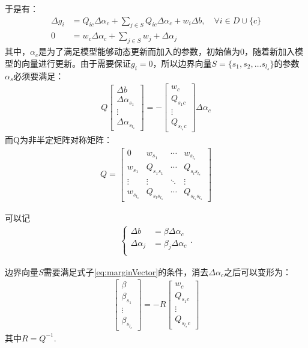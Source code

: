 \documentclass[UTF8]{csoarticle}
\begin{document}
于是有：
\begin{align}\label{eq:deltag}
\Delta g_i &= Q_{ic}\Delta\alpha_c+\sum_{j\in S}{Q_{ic}\Delta\alpha_c}+ w_i\Delta b, \quad \forall i \in D \cup\{c\}\\
0&=w_c\Delta\alpha_c+\sum_{j \in S}w_j +\Delta\alpha_j
\end{align}
其中，$\alpha_c$是为了满足模型能够动态更新而加入的参数，初始值为0，随着新加入模型的向量进行更新。由于需要保证$g_i=0$，所以边界向量$S=\{s_1,s_2,…s_{l_s}\}$的参数$\alpha_s$必须要满足：
\begin{align}\label{eq:marginVector}
Q\begin{bmatrix}\Delta b\\ \Delta \alpha_{s_1} \\ \vdots\\  \Delta\alpha_{s_{l_s}}\end{bmatrix} = - \begin{bmatrix}w_c\\ Q_{s_{1}c} \\ \vdots \\ Q_{s_{l_s}c} \end{bmatrix}\Delta\alpha_c
\end{align}
而Q为非半定矩阵对称矩阵：
\begin{align}\label{eq:Q}
Q=\begin{bmatrix}0 & w_{s_1} & \cdots & w_{s_{l_s}}\\w_{s_1} & Q_{s_1 s_1} & \cdots & Q_{s_l s_{l_s}}\\\vdots & \vdots & \ddots &\vdots \\w_{s_{l_s}} & Q_{s_l s_{l_s}} & \cdots & Q_{s_{l_s} s_{l_s}}\end{bmatrix}
\end{align}

可以记
\begin{align}\label{eq:deltabdeltaalphac}
\begin{cases}
\Delta b &=\beta\Delta\alpha_c\\
\Delta \alpha_j&=\beta_j\Delta\alpha_c\\
\end{cases}.
\end{align}

边界向量$S$需要满足式子\eqref{eq:marginVector}的条件，消去$\Delta\alpha_c$之后可以变形为：
\begin{align}\label{eq:marginVector2}
\begin{bmatrix}\beta\\ \beta_{s_1} \\ \vdots\\  \beta_{s_{l_s}}\end{bmatrix} = - R \begin{bmatrix}w_c\\ Q_{s_{1}c} \\ \vdots \\ Q_{s_{l_s}c} \end{bmatrix}
\end{align}
其中$R=Q^{-1}$.
\end{document}
